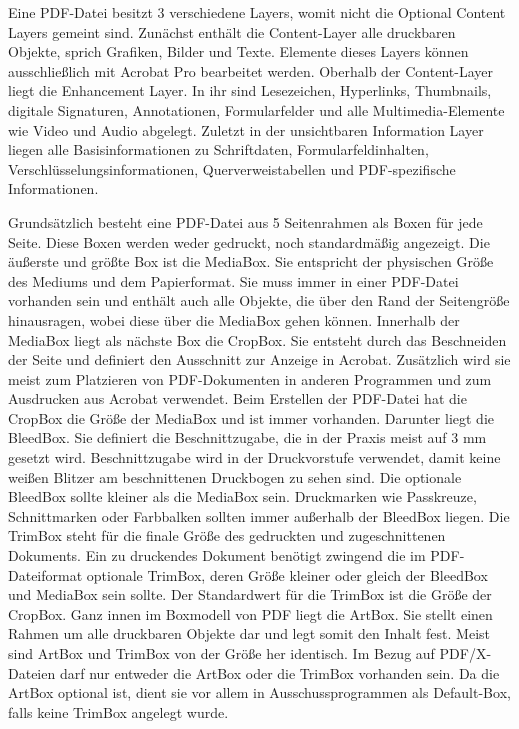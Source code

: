 \par
Eine PDF-Datei besitzt 3 verschiedene Layers, womit nicht die Optional Content Layers gemeint sind.  Zunächst enthält die Content-Layer alle druckbaren Objekte, sprich Grafiken, Bilder und Texte. Elemente dieses Layers können ausschließlich mit Acrobat Pro bearbeitet werden. Oberhalb der Content-Layer liegt die Enhancement Layer. In ihr sind Lesezeichen, Hyperlinks, Thumbnails, digitale Signaturen, Annotationen, Formularfelder und alle Multimedia-Elemente wie Video und Audio abgelegt. Zuletzt in der unsichtbaren Information Layer liegen alle Basisinformationen zu Schriftdaten, Formularfeldinhalten, Verschlüsselungsinformationen, Querverweistabellen und PDF-spezifische Informationen. \cite{schneeberger}
\par
Grundsätzlich besteht eine PDF-Datei aus 5 Seitenrahmen als Boxen für jede Seite. Diese Boxen werden weder gedruckt, noch standardmäßig angezeigt. Die äußerste und größte Box ist die MediaBox. Sie entspricht der physischen Größe des Mediums und dem Papierformat. Sie muss immer in einer PDF-Datei vorhanden sein und enthält auch alle Objekte, die über den Rand der Seitengröße hinausragen, wobei diese über die MediaBox gehen können. Innerhalb der MediaBox liegt als nächste Box die CropBox. Sie entsteht durch das Beschneiden der Seite und definiert den Ausschnitt zur Anzeige in Acrobat. Zusätzlich wird sie meist zum Platzieren von PDF-Dokumenten in anderen Programmen und zum Ausdrucken aus Acrobat verwendet. Beim Erstellen der PDF-Datei hat die CropBox die Größe der MediaBox und ist immer vorhanden. Darunter liegt die BleedBox. Sie definiert die Beschnittzugabe, die in der Praxis meist auf 3 mm gesetzt wird. Beschnittzugabe wird in der Druckvorstufe verwendet, damit keine weißen Blitzer am beschnittenen Druckbogen zu sehen sind. Die optionale BleedBox sollte kleiner als die MediaBox sein. Druckmarken wie Passkreuze, Schnittmarken oder Farbbalken sollten immer außerhalb der BleedBox liegen. Die TrimBox steht für die finale Größe des gedruckten und zugeschnittenen Dokuments. Ein zu druckendes Dokument benötigt zwingend die im PDF-Dateiformat optionale TrimBox, deren Größe kleiner oder gleich der BleedBox und MediaBox sein sollte. Der Standardwert für die TrimBox ist die Größe der CropBox. Ganz innen im Boxmodell von PDF liegt die ArtBox. Sie stellt einen Rahmen um alle druckbaren Objekte dar und legt somit den Inhalt fest. Meist sind ArtBox und TrimBox von der Größe her identisch. Im Bezug auf PDF/X-Dateien darf nur entweder die ArtBox oder die TrimBox vorhanden sein. Da die ArtBox optional ist, dient sie vor allem in Ausschussprogrammen als Default-Box, falls keine TrimBox angelegt wurde. 


